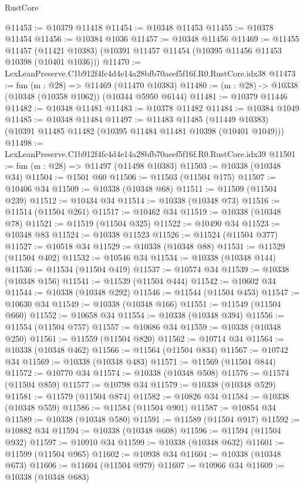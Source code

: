 \begin{lexlean}{RustCore}
\begin{coremodule}
@11453 := @10379 @11418
@11454 := @10348 @11453
@11455 := @10378 @11454
@11456 := @10384 @1036
@11457 := @10348 @11456
@11469 := @11455
    @11457
    (@11421 @10383)
    (@10391 @11457 @11454 (@10395 @11456 @11453 @10398 (@10401 @1036)))
@11470 := LexLeanPreserve.C1b912f4fc4d4e14a28bfb70aeef5f16f.R0.RustCore.idx38
@11473 := fun (m : @28) => @11469 (@11470 @10383)
@11480 := (m : @28) -> @10338 (@10348 (@10358 @1062)) (@10344 @5950 @6144)
@11481 := @10379 @11446
@11482 := @10348 @11481
@11483 := @10378 @11482
@11484 := @10384 @1049
@11485 := @10348 @11484
@11497 := @11483
    @11485
    (@11449 @10383)
    (@10391 @11485 @11482 (@10395 @11484 @11481 @10398 (@10401 @1049)))
@11498 := LexLeanPreserve.C1b912f4fc4d4e14a28bfb70aeef5f16f.R0.RustCore.idx39
@11501 := fun (m : @28) => @11497 (@11498 @10383)
@11503 := @10338 (@10348 @34)
@11504 := @1501 @60
@11506 := @11503 (@11504 @175)
@11507 := @10406 @34
@11509 := @10338 (@10348 @68)
@11511 := @11509 (@11504 @239)
@11512 := @10434 @34
@11514 := @10338 (@10348 @73)
@11516 := @11514 (@11504 @261)
@11517 := @10462 @34
@11519 := @10338 (@10348 @78)
@11521 := @11519 (@11504 @325)
@11522 := @10490 @34
@11523 := @10348 @83
@11524 := @10338 @11523
@11526 := @11524 (@11504 @377)
@11527 := @10518 @34
@11529 := @10338 (@10348 @88)
@11531 := @11529 (@11504 @402)
@11532 := @10546 @34
@11534 := @10338 (@10348 @144)
@11536 := @11534 (@11504 @419)
@11537 := @10574 @34
@11539 := @10338 (@10348 @156)
@11541 := @11539 (@11504 @444)
@11542 := @10602 @34
@11544 := @10338 (@10348 @292)
@11546 := @11544 (@11504 @453)
@11547 := @10630 @34
@11549 := @10338 (@10348 @166)
@11551 := @11549 (@11504 @660)
@11552 := @10658 @34
@11554 := @10338 (@10348 @394)
@11556 := @11554 (@11504 @757)
@11557 := @10686 @34
@11559 := @10338 (@10348 @250)
@11561 := @11559 (@11504 @820)
@11562 := @10714 @34
@11564 := @10338 (@10348 @462)
@11566 := @11564 (@11504 @834)
@11567 := @10742 @34
@11569 := @10338 (@10348 @483)
@11571 := @11569 (@11504 @844)
@11572 := @10770 @34
@11574 := @10338 (@10348 @508)
@11576 := @11574 (@11504 @859)
@11577 := @10798 @34
@11579 := @10338 (@10348 @529)
@11581 := @11579 (@11504 @874)
@11582 := @10826 @34
@11584 := @10338 (@10348 @559)
@11586 := @11584 (@11504 @901)
@11587 := @10854 @34
@11589 := @10338 (@10348 @580)
@11591 := @11589 (@11504 @917)
@11592 := @10882 @34
@11594 := @10338 (@10348 @608)
@11596 := @11594 (@11504 @932)
@11597 := @10910 @34
@11599 := @10338 (@10348 @632)
@11601 := @11599 (@11504 @965)
@11602 := @10938 @34
@11604 := @10338 (@10348 @673)
@11606 := @11604 (@11504 @979)
@11607 := @10966 @34
@11609 := @10338 (@10348 @683)

\end{coremodule}
\end{lexlean}
